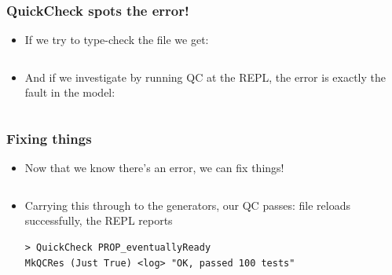 \documentclass[compress,handout]{beamer}
\begin{document}
\begin{frame}
  \frametitle{QuickCheck spots the error!}

  \begin{itemize}
    \item<1-> If we try to type-check the file we get:
              \vspace*{1mm}
              \inputminted[fontsize=\scriptsize]{Idris}{qc-things/ATM-qc-error.idr}
    \item<2-> And if we investigate by running QC at the REPL, the error is
              exactly the fault in the model:
              \vspace*{1mm}
              \inputminted[fontsize=\scriptsize]{Idris}{qc-things/qc-trace-4.idr}
              \vspace*{-4mm}
  \end{itemize}

\end{frame}


\begin{frame}[fragile]
  \frametitle{Fixing things}

  \begin{itemize}
    \item<1-> Now that we know there's an error, we can fix things!
              \inputminted[fontsize=\scriptsize]{Idris}{qc-things/ATM-fixed-chkpin.idr}

    \item<2-> Carrying this through to the generators, our QC passes: file reloads
              successfully, the REPL reports
              \begin{verbatim}
> QuickCheck PROP_eventuallyReady
MkQCRes (Just True) <log> "OK, passed 100 tests"
              \end{verbatim}
  \end{itemize}

  \vspace*{-3mm}

\end{frame}
\end{document}
